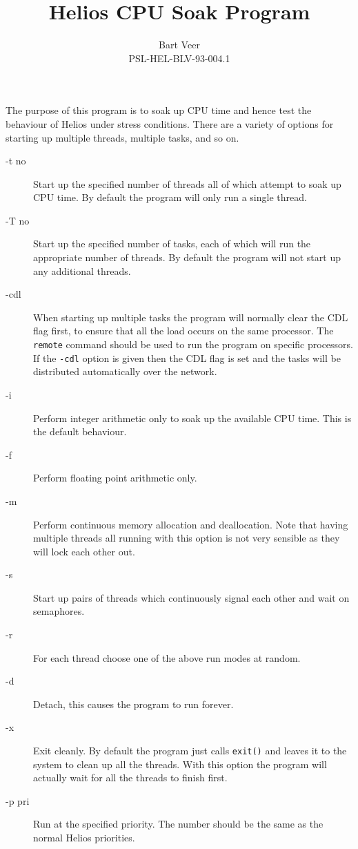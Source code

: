 \title{Helios CPU Soak Program}
\author{Bart Veer \\ PSL-HEL-BLV-93-004.1}

\maketitle

The purpose of this program is to soak up CPU time and hence test
the behaviour of Helios under stress conditions. There are
a variety of options for starting up multiple threads, multiple tasks,
and so on.

\begin{description}
\item [-t no] Start up the specified number of threads all of which
attempt to soak up CPU time. By default the program will only run a
single thread.
\item [-T no] Start up the specified number of tasks, each of which
will run the appropriate number of threads. By default the program
will not start up any additional threads.
\item [-cdl] When starting up multiple tasks the program will normally
clear the CDL flag first, to ensure that all the load occurs on the same
processor. The {\tt remote} command should be used to run the program
on specific processors. If the {\tt -cdl} option is given then the
CDL flag is set and the tasks will be distributed automatically over
the network.
\item [-i] Perform integer arithmetic only to soak up the available
CPU time. This is the default behaviour.
\item [-f] Perform floating point arithmetic only.
\item [-m] Perform continuous memory allocation and deallocation.
Note that having multiple threads all running with this option is
not very sensible as they will lock each other out.
\item [-s] Start up pairs of threads which continuously signal each
other and wait on semaphores. 
\item [-r] For each thread choose one of the above run modes at
random.
\item [-d] Detach, this causes the program to run forever.
\item [-x] Exit cleanly. By default the program just calls {\tt exit()}
and leaves it to the system to clean up all the threads. With this
option the program will actually wait for all the threads to finish
first.
\item [-p pri] Run at the specified priority. The number should be
the same as the normal Helios priorities.


\end{description}
